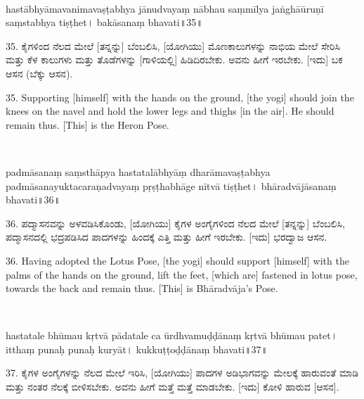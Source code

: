 \newpage

~\vskip 1cm

\dummyimage
\begin{sans}
hastābhyāmavanimavaṣṭabhya jānudvayaṃ nābhau saṃmīlya jaṅghā{}ūruṇī saṃstabhya tiṣṭhet। bakāsanaṃ bhavati॥35॥
\end{sans}
\bigskip

\begin{kan}
35.	ಕೈಗಳಿಂದ ನೆಲದ ಮೇಲೆ [ತನ್ನನ್ನು] ಬೆಂಬಲಿಸಿ, [ಯೋಗಿಯು] ಮೊಣಕಾಲುಗಳನ್ನು ನಾಭಿಯ ಮೇಲೆ ಸೇರಿಸಿ ಮತ್ತು ಕೆಳ ಕಾಲುಗಳು ಮತ್ತು ತೊಡೆಗಳನ್ನು [ಗಾಳಿಯಲ್ಲಿ] ಹಿಡಿದಿರಬೇಕು. ಅವನು ಹೀಗೆ ಇರಬೇಕು. [ಇದು] ಬಕ ಆಸನ (ಬೆಕ್ಕು ಆಸನ).
\end{kan}
\bigskip

\begin{eng}
35. Supporting [himself] with the hands on the ground, [the yogi] should join the knees on the navel and hold the lower legs and thighs [in the air]. He should remain thus. [This] is the Heron Pose.
\end{eng}

\newpage

~\vskip 1cm

\dummyimage
\begin{sans}
padmāsanaṃ saṃsthāpya hastatalābhyāṃ dharāmavaṣṭabhya padmāsanayuktacaraṇadvayaṃ pṛṣṭhabhāge nītvā tiṣṭhet। bhāradvājāsanaṃ bhavati॥36॥
\end{sans}
\bigskip

\begin{kan}
36.	ಪದ್ಮಾಸನವನ್ನು ಅಳವಡಿಸಿಕೊಂಡು, [ಯೋಗಿಯು] ಕೈಗಳ ಅಂಗೈಗಳಿಂದ ನೆಲದ ಮೇಲೆ [ತನ್ನನ್ನು] ಬೆಂಬಲಿಸಿ, ಪದ್ಮಾಸನದಲ್ಲಿ ಭದ್ರಪಡಿಸಿದ ಪಾದಗಳನ್ನು ಹಿಂದಕ್ಕೆ ಎತ್ತಿ ಮತ್ತು ಹೀಗೆ ಇರಬೇಕು. [ಇದು] ಭರದ್ವಾಜ ಆಸನ.
\end{kan}
\bigskip

\begin{eng}
36. Having adopted the Lotus Pose, [the yogi] should support [himself] with the palms of the hands on the ground, lift the feet, [which are] fastened in lotus pose, towards the back and remain thus. [This] is Bhāradvāja’s Pose.
\end{eng}

\newpage

~\vskip 1cm

\dummyimage
\begin{sans}
hastatale bhūmau kṛtvā pādatale ca ūrdhvamuḍḍānaṃ kṛtvā bhūmau patet। itthaṃ punaḥ punaḥ kuryāt। kukkuṭṭoḍḍānaṃ bhavati॥37॥
\end{sans}
\bigskip

\begin{kan}
37.	ಕೈಗಳ ಅಂಗೈಗಳನ್ನು ನೆಲದ ಮೇಲೆ ಇರಿಸಿ, [ಯೋಗಿಯು] ಪಾದಗಳ ಅಡಿಭಾಗವನ್ನು ಮೇಲಕ್ಕೆ ಹಾರುವಂತೆ ಮಾಡಿ ಮತ್ತು ನಂತರ ನೆಲಕ್ಕೆ ಬೀಳಿಸಬೇಕು. ಅವನು ಹೀಗೆ ಮತ್ತೆ ಮತ್ತೆ ಮಾಡಬೇಕು. [ಇದು] ಕೋಳಿ ಹಾರುವ [ಆಸನ].
\end{kan}
\bigskip

